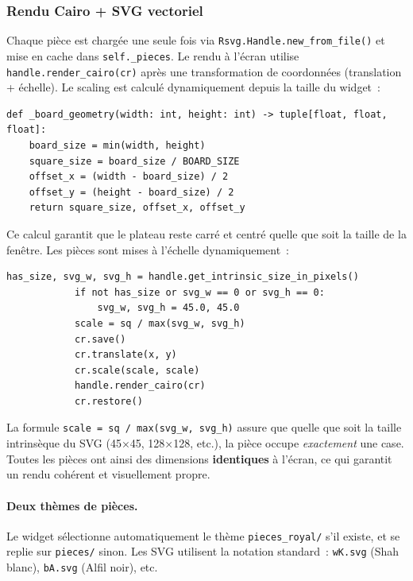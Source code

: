 \documentclass[a4paper,11pt]{article}
\begin{document}
\subsubsection{Rendu Cairo + SVG vectoriel}

Chaque pièce est chargée une seule fois via \texttt{Rsvg.Handle.new\_from\_file()}
et mise en cache dans \texttt{self.\_pieces}. Le rendu à l'écran utilise
\texttt{handle.render\_cairo(cr)} après une transformation de coordonnées
(translation + échelle). Le scaling est calculé dynamiquement depuis la taille
du widget~:

\begin{verbatim}
def _board_geometry(width: int, height: int) -> tuple[float, float, float]:
    board_size = min(width, height)
    square_size = board_size / BOARD_SIZE
    offset_x = (width - board_size) / 2
    offset_y = (height - board_size) / 2
    return square_size, offset_x, offset_y
\end{verbatim}

Ce calcul garantit que le plateau reste carré et centré quelle que soit la
taille de la fenêtre. Les pièces sont mises à l'échelle dynamiquement~:

\begin{verbatim}
has_size, svg_w, svg_h = handle.get_intrinsic_size_in_pixels()
            if not has_size or svg_w == 0 or svg_h == 0:
                svg_w, svg_h = 45.0, 45.0
            scale = sq / max(svg_w, svg_h)
            cr.save()
            cr.translate(x, y)
            cr.scale(scale, scale)
            handle.render_cairo(cr)
            cr.restore()
\end{verbatim}

La formule \texttt{scale = sq / max(svg\_w, svg\_h)} assure que quelle que
soit la taille intrinsèque du SVG (45×45, 128×128, etc.), la pièce occupe
\emph{exactement} une case. Toutes les pièces ont ainsi des dimensions
\textbf{identiques} à l'écran, ce qui garantit un rendu cohérent et
visuellement propre.

\paragraph{Deux thèmes de pièces.}
Le widget sélectionne automatiquement le thème \texttt{pieces\_royal/} s'il
existe, et se replie sur \texttt{pieces/} sinon. Les SVG utilisent la notation
standard~: \texttt{wK.svg} (Shah blanc), \texttt{bA.svg} (Alfil noir), etc.
\end{document}
